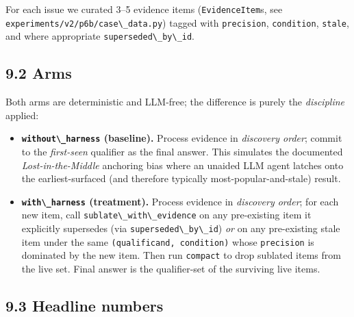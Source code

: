 For each issue we curated 3--5 evidence items (\passthrough{\lstinline!EvidenceItem!}s, see \passthrough{\lstinline!experiments/v2/p6b/case\_data.py!}) tagged with \passthrough{\lstinline!precision!}, \passthrough{\lstinline!condition!}, \passthrough{\lstinline!stale!}, and where appropriate \passthrough{\lstinline!superseded\_by\_id!}.

\subsection{9.2 Arms}\label{arms}

Both arms are deterministic and LLM-free; the difference is purely the \emph{discipline} applied:

\begin{itemize}
\item
  \textbf{\passthrough{\lstinline!without\_harness!} (baseline).} Process evidence in \emph{discovery order}; commit to the \emph{first-seen} qualifier as the final answer. This simulates the documented \emph{Lost-in-the-Middle} anchoring bias \citep{liu2023lostmiddle} where an unaided LLM agent latches onto the earliest-surfaced (and therefore typically most-popular-and-stale) result.
\item
  \textbf{\passthrough{\lstinline!with\_harness!} (treatment).} Process evidence in \emph{discovery order}; for each new item, call \passthrough{\lstinline!sublate\_with\_evidence!} on any pre-existing item it explicitly supersedes (via \passthrough{\lstinline!superseded\_by\_id!}) \emph{or} on any pre-existing stale item under the same \passthrough{\lstinline!(qualificand, condition)!} whose \passthrough{\lstinline!precision!} is dominated by the new item. Then run \passthrough{\lstinline!compact!} to drop sublated items from the live set. Final answer is the qualifier-set of the surviving live items.
\end{itemize}

\subsection{9.3 Headline numbers}\label{headline-numbers}

